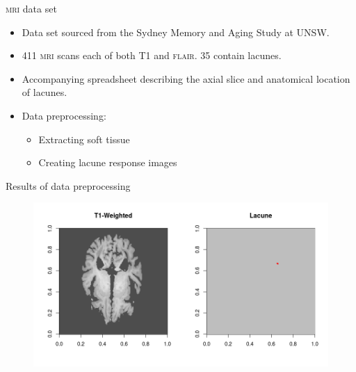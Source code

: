 \documentclass{beamer}
\begin{document}
\begin{frame}{\textsc{mri} data set}
\begin{itemize}
\item Data set sourced from the Sydney Memory and Aging Study at UNSW.
\item 411 \textsc{mri} scans each of both T1 and \textsc{flair}. 35 contain lacunes.
\item Accompanying spreadsheet describing the axial slice and anatomical location of lacunes. 
\item Data preprocessing:
\begin{itemize}
	\item Extracting soft tissue
	\item Creating lacune response images
\end{itemize}
\end{itemize}
\end{frame}



\begin{frame}{Results of data preprocessing}
\begin{figure}
\centering
\includegraphics[width=\linewidth]{../Thesis_Docs/Images/6_soft_lacune.png}
\end{figure}
\end{frame}
\end{document}
